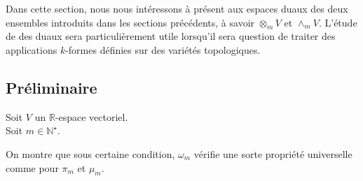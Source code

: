 \documentclass[../geometrie.tex]{subfiles}
\begin{document}
	Dans cette section, nous nous intéressons à présent aux espaces duaux des deux ensembles introduits dans les sections précédents, à savoir $\otimes_{m} V$ et $\wedge_{m} V$. L'étude de des duaux sera particulièrement utile lorsqu'il sera question de traiter des applications \flqq{} $k$-formes \frqq{} définies sur des variétés topologiques.

	\subsection{Préliminaire}{
		\noindent Soit $V$ un $\mathbb{R}$-espace vectoriel. \\
		\noindent Soit $m \in \mathbb{N}^{\star}$.


		On montre que sous certaine condition, $\omega_{m}$ vérifie une sorte propriété universelle comme pour $\pi_{m}$ et $\mu_{m}$.


}
\end{document}
